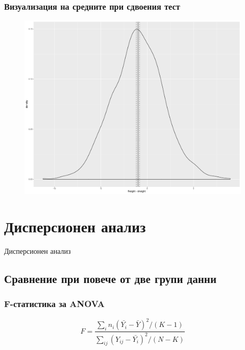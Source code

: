 \documentclass{beamer}
\begin{document}
\begin{frame}
\frametitle{Визуализация на средните при сдвоения тест}
\begin{figure}[]\includegraphics[width=\textwidth,height=0.75\textheight]{pic0058}\end{figure}
\end{frame}

\section{Дисперсионен анализ}

\begin{frame}
\center \huge{Дисперсионен анализ}
\end{frame}

\subsection{Сравнение при повече от две групи данни}

\begin{frame}
\frametitle{F-статистика за ANOVA}
\begin{equation}
F = \frac{ \sum_{i}^{}n_i(\bar{Y_i}-\bar{Y})^2 / (K-1) }{ \sum_{ij}^{}(Y_{ij}-\bar{Y_i})^2 / (N-K) }
\end{equation}
\end{frame}
\end{document}
